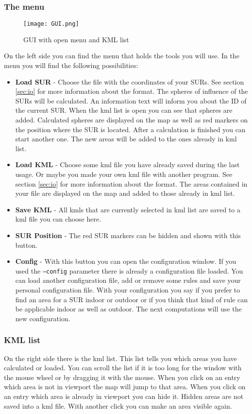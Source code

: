 \documentclass[11pt,fleqn]{book} %
\begin{document}
\subsubsection{The menu}
\begin{figure}
\centering
\texttt{[image: GUI.png]}
\caption{GUI with open menu and KML list}
\end{figure}
On the left side you can find the menu that holds the tools you will use. In the menu you will find the following possibilities:
\begin{itemize}
	\item \textbf{Load SUR} - Choose the file with the coordinates of your SURs. See section \ref{sec:io} for more information about the format. The spheres of influence of the SURs will be calculated. An information text will inform you about the ID of the current SUR. When the kml list is open you can see that spheres are added. Calculated spheres are displayed on the map as well as red markers on the position where the SUR is located. After a calculation is finished you can start another one. The new areas will be added to the ones already in kml list.
	\item \textbf{Load KML} - Choose some kml file you have already saved during the last usage. Or maybe you made your own kml file with another program. See section \ref{sec:io} for more information about the format. The areas contained in your file are displayed on the map and added to those already in kml list.
	\item \textbf{Save KML} - All kmls that are currently selected in kml list are saved to a kml file you can choose here.
	\item \textbf{SUR Position} - The red SUR markers can be hidden and shown with this button.
	\item \textbf{Config} - With this button you can open the configuration window. If you used the \texttt{--config} parameter there is already a configuration file loaded. You can load another configuration file, add or remove some rules and save your personal configuration file. With your configuration you say if you prefer to find an area for a SUR indoor or outdoor or if you think that kind of rule can be applicable indoor as well as outdoor. The next computations will use the new configuration.
\end{itemize}

\subsubsection{KML list}
On the right side there is the kml list. This list tells you which areas you have calculated or loaded. You can scroll the list if it is too long for the window with the mouse wheel or by dragging it with the mouse. When you click on an entry which area is not in viewport the map will jump to that area. When you click on an entry which area is already in viewport you can hide it. Hidden areas are not saved into a kml file. With another click you can make an area visible again.
\end{document}
